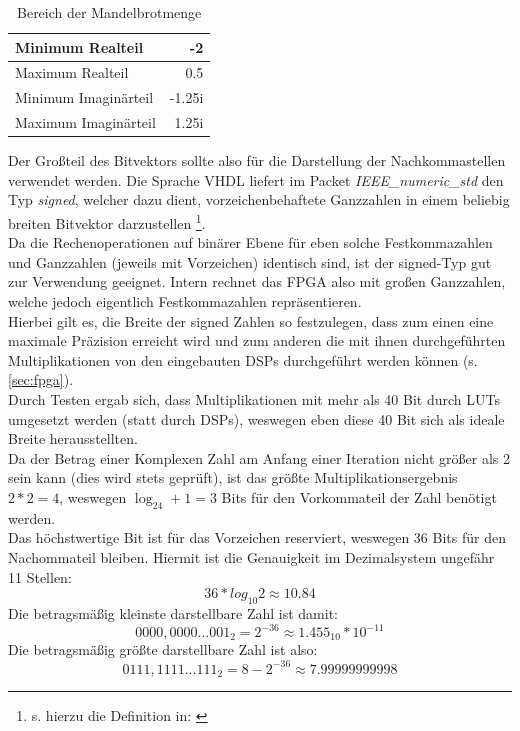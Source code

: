 \documentclass[a4paper,12pt,onesided]{report}
\begin{document}
\begin{table}[H]
	\centering
	\begin{tabular}{|l|r|}	
		\hline
		Minimum Realteil & -2 \\ \hline
		Maximum Realteil & 0.5 \\ \hline
		Minimum Imaginärteil & -1.25i \\ \hline
		Maximum Imaginärteil & 1.25i \\ \hline
	\end{tabular}
	\caption{Bereich der Mandelbrotmenge}
	\label{tab:minmaxmandel}
\end{table}

Der Großteil des Bitvektors sollte also für die Darstellung der Nachkommastellen verwendet werden.
Die Sprache VHDL liefert im Packet \textit{IEEE\_numeric\_std} den Typ \textit{signed}, welcher dazu dient, vorzeichenbehaftete Ganzzahlen in einem beliebig breiten Bitvektor darzustellen \footnote{s. hierzu die Definition in: \cite{ieeeNumeric}}.\\
Da die Rechenoperationen auf binärer Ebene für eben solche Festkommazahlen und Ganzzahlen (jeweils mit Vorzeichen) identisch sind, ist der signed-Typ gut zur Verwendung geeignet.
Intern rechnet das FPGA also mit großen Ganzzahlen, welche jedoch eigentlich Festkommazahlen repräsentieren.\\
Hierbei gilt es, die Breite der signed Zahlen so festzulegen, dass zum einen eine maximale Präzision erreicht wird und zum anderen die mit ihnen durchgeführten Multiplikationen von den eingebauten DSPs durchgeführt werden können (s. \autoref{sec:fpga}).\\
Durch Testen ergab sich, dass Multiplikationen mit mehr als 40 Bit durch LUTs umgesetzt werden (statt durch DSPs), weswegen eben diese 40 Bit sich als ideale Breite herausstellten.\\
Da der Betrag einer Komplexen Zahl am Anfang einer Iteration nicht größer als 2 sein kann (dies wird stets geprüft), ist das größte Multiplikationsergebnis $2*2=4$, weswegen $\log_24+1=3$ Bits für den Vorkommateil der Zahl benötigt werden.\\
Das höchstwertige Bit ist für das Vorzeichen reserviert, weswegen 36 Bits für den Nachommateil bleiben. Hiermit ist die Genauigkeit im Dezimalsystem ungefähr 11 Stellen:
\[36 * log_{10}2 \approx 10.84\]
Die betragsmäßig kleinste darstellbare Zahl ist damit:
\[0000,0000...001_2 = 2^{-36} \approx 1.455_{10}*10^{-11} \]
Die betragsmäßig größte darstellbare Zahl ist also:
\[0111,1111...111_2 = 8 - 2^{-36} \approx 7.99999999998 \]
\end{document}
